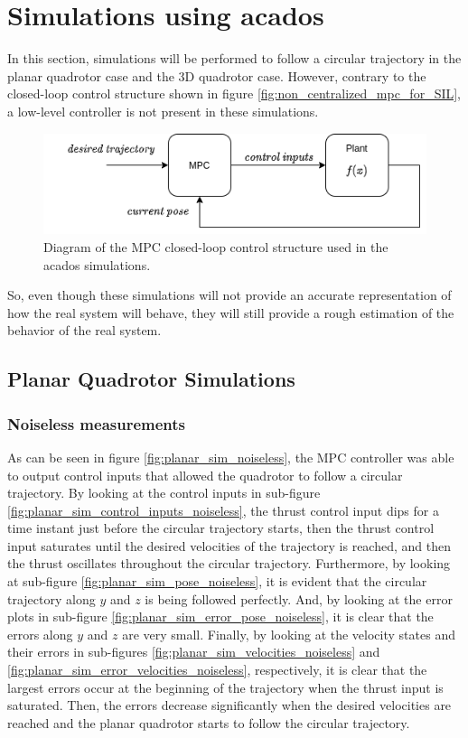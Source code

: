 \documentclass{thesisreport}
\begin{document}
\newpage

\section{Simulations using acados}
In this section, simulations will be performed to follow a circular trajectory in the planar quadrotor case and the 3D quadrotor case. However, contrary to the closed-loop control structure shown in figure \ref{fig:non_centralized_mpc_for_SIL}, a low-level controller is not present in these simulations.

\begin{figure}[h]
	\centering
	\includegraphics[width=.7\textwidth]{Images/diagrams/old_sim_rev1.png}
	\caption{Diagram of the MPC closed-loop control structure used in the acados simulations.}
	\label{fig:diagram_acados_simulations}
\end{figure}
 
 So, even though these simulations will not provide an accurate representation of how the real system will behave, they will still provide a rough estimation of the behavior of the real system.
 
\subsection{Planar Quadrotor Simulations}

\subsubsection*{Noiseless measurements}

As can be seen in figure \ref{fig:planar_sim_noiseless}, the MPC controller was able to output control inputs that allowed the quadrotor to follow a circular trajectory. By looking at the control inputs in sub-figure \ref{fig:planar_sim_control_inputs_noiseless}, the thrust control input dips for a time instant just before the circular trajectory starts, then the thrust control input saturates until the desired velocities of the trajectory is reached, and then the thrust oscillates throughout the circular trajectory. Furthermore, by looking at sub-figure \ref{fig:planar_sim_pose_noiseless}, it is evident that the circular trajectory along $y$ and $z$ is being followed perfectly. And, by looking at the error plots in sub-figure \ref{fig:planar_sim_error_pose_noiseless}, it is clear that the errors along $y$ and $z$ are very small. Finally, by looking at the velocity states and their errors in sub-figures \ref{fig:planar_sim_velocities_noiseless} and \ref{fig:planar_sim_error_velocities_noiseless}, respectively, it is clear that the largest errors occur at the beginning of the trajectory when the thrust input is saturated. Then, the errors decrease significantly when the desired velocities are reached and the planar quadrotor starts to follow the circular trajectory.
\end{document}
